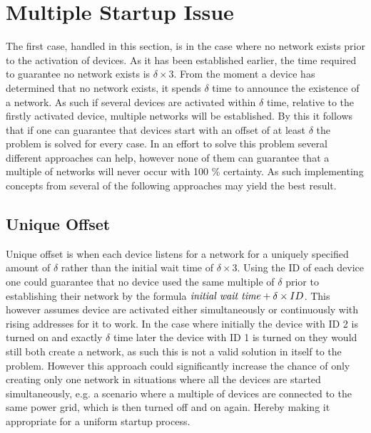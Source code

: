 \section{Multiple Startup Issue}\label{sec:MSI-CCRC}
The first case, handled in this section, is in the case where no network exists prior to the activation of devices.
As it has been established earlier, the time required to guarantee no network exists is $\delta \times 3$.
From the moment a device has determined that no network exists, it spends $\delta$ time to announce the existence of a network.
As such if several devices are activated within $\delta$ time, relative to the firstly activated device, multiple networks will be established.
By this it follows that if one can guarantee that devices start with an offset of at least $\delta$ the problem is solved for every case.
In an effort to solve this problem several different approaches can help, however none of them can guarantee that a multiple of networks will never occur with 100 \% certainty. 
As such implementing concepts from several of the following approaches may yield the best result.

\subsection{Unique Offset}
Unique offset is when each device listens for a network for a uniquely specified amount of $\delta$ rather than the initial wait time of $\delta \times 3$.
Using the ID of each device one could guarantee that no device used the same multiple of $\delta$ prior to establishing their network by the formula $\text{\textit{initial wait time}} + \delta \times ID$.
This however assumes device are activated either simultaneously or continuously with rising addresses for it to work.
In the case where initially the device with ID 2 is turned on and exactly $\delta$ time later the device with ID 1 is turned on they would still both create a network, as such this is not a valid solution in itself to the problem.
However this approach could significantly increase the chance of only creating only one network in situations where all the devices are started simultaneously, e.g. a scenario where a multiple of devices are connected to the same power grid, which is then turned off and on again.
Hereby making it appropriate for a uniform startup process.

